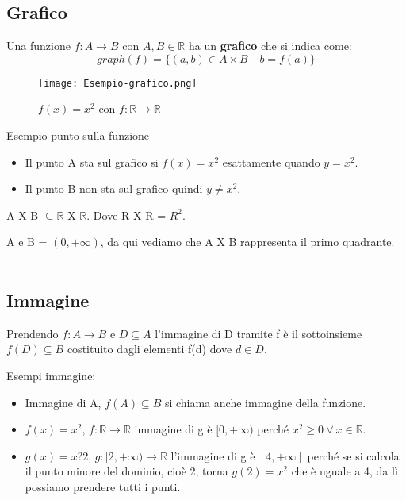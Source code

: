 \subsection{Grafico}
Una funzione $f: A \longrightarrow B$ con $A,B \in \mathbb{R}$ ha un \textbf{grafico} che si indica come:
\begin{equation}
    graph(f) = \{(a,b) \in A \times B\ \mid b = f(a)\}
\end{equation}
\begin{wrapfigure}[8]{l}{7cm}
    \centering
    \texttt{[image: Esempio-grafico.png]}
    \caption{$f(x) = x^2$ con $f: \mathbb{R} \longrightarrow \mathbb{R}$}
    \label{fig:esempio-grafico}
\end{wrapfigure}
\begin{example}
Esempio punto sulla funzione
\begin{itemize}
    \item Il punto A sta sul grafico si $f(x) = x^2$ esattamente quando $y = x^2$.
    \item Il punto B non sta sul grafico quindi $y \neq x^2$.
\end{itemize}
\end{example}
\begin{note}
    A X B $\subseteq \mathbb{R}$ X $\mathbb{R}$. Dove R X R = $R^2$.
\end{note}
\begin{example}
A e B = $(0, +\infty)$, da qui vediamo che A X B rappresenta il primo quadrante.\\\\
\end{example}

\subsection{Immagine}
\begin{definition}[Immagine]
Prendendo $f: A \longrightarrow B$ e $D \subseteq A$ l'immagine di D tramite f è il sottoinsieme $f(D) \subseteq B$ costituito dagli elementi f(d) dove $d \in D$.
\end{definition}
\begin{example}
    Esempi immagine:
    \begin{itemize}
        \item Immagine di A, $f(A) \subseteq B$ si chiama anche immagine della funzione.
        \item $f(x) = x^2$, $f: \mathbb{R} \longrightarrow \mathbb{R}$ \hspace{.2cm} immagine di g è $[0, +\infty)$ perché $x^2 \geq 0 \: \forall \: x \in \mathbb{R}$.
        \item $g(x) = x?2$, $g:[2, +\infty) \longrightarrow \mathbb{R}$ \hspace{.2cm} l'immagine di g è $[4, +\infty]$ perché se si calcola il punto minore del dominio, cioè 2, torna $g(2) = x^2$ che è uguale a 4, da lì possiamo prendere tutti i punti.
    \end{itemize}
\end{example}

